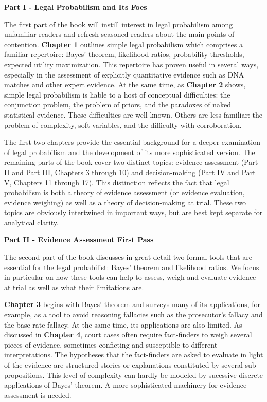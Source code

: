 \documentclass[
  10pt,
  dvipsnames,enabledeprecatedfontcommands]{scrartcl}
\begin{document}
\noindent \textbf{Part I - Legal Probabilism and Its Foes}

\noindent The first part of the book will instill interest in legal
probabilism among unfamiliar readers and refresh seasoned readers about
the main points of contention. \textbf{Chapter 1} outlines simple legal
probabilism which comprises a familiar repertoire: Bayes' theorem,
likelihood ratios, probability thresholds, expected utility
maximization. This repertoire has proven useful in several ways,
especially in the assessment of explicitly quantitative evidence such as
DNA matches and other expert evidence. At the same time, as
\textbf{Chapter 2} shows, simple legal probabilism is liable to a host
of conceptual difficulties: the conjunction problem, the problem of
priors, and the paradoxes of naked statistical evidence. These
difficulties are well-known. Others are less familiar: the problem of
complexity, soft variables, and the difficulty with corroboration.

The first two chapters provide the essential background for a deeper
examination of legal probabilism and the development of its more
sophisticated version. The remaining parts of the book cover two
distinct topics: evidence assessment (Part II and Part III, Chapters 3
through 10) and decision-making (Part IV and Part V, Chapters 11 through
17). This distinction reflects the fact that legal probabilism is both a
theory of evidence assessment (or evidence evaluation, evidence
weighing) as well as a theory of decision-making at trial. These two
topics are obviously intertwined in important ways, but are best kept
separate for analytical clarity.

\vspace{3mm}

\noindent \textbf{Part II - Evidence Assessment First Pass}

\noindent The second part of the book discusses in great detail two
formal tools that are essential for the legal probabilist: Bayes'
theorem and likelihood ratios. We focus in particular on how these tools
can help to assess, weigh and evaluate evidence at trial as well as what
their limitations are.

\textbf{Chapter 3} begins with Bayes' theorem and surveys many of its
applications, for example, as a tool to avoid reasoning fallacies such
as the prosecutor's fallacy and the base rate fallacy. At the same time,
its applications are also limited. As discussed in \textbf{Chapter 4},
court cases often require fact-finders to weigh several pieces of
evidence, sometimes conficting and susceptible to different
interpretations. The hypotheses that the fact-finders are asked to
evaluate in light of the evidence are structured stories or explanations
constituted by several sub-propositions. This level of complexity can
hardly be modeled by sucessive discrete applications of Bayes' theorem.
A more sophisticated machinery for evidence assessment is needed.
\end{document}

